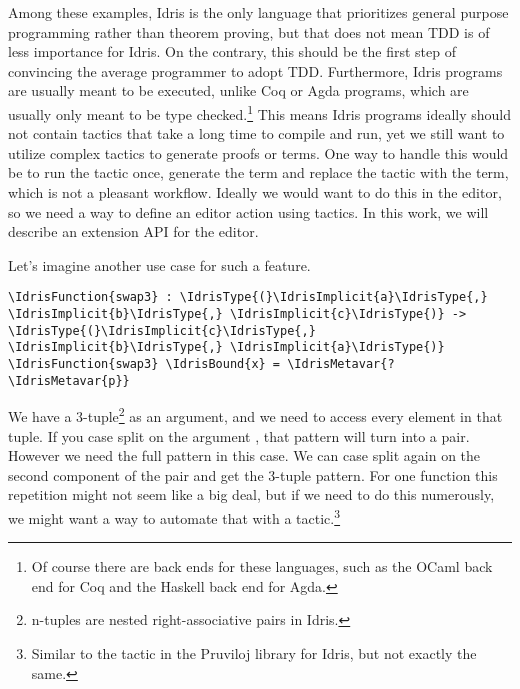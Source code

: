 
Among these examples, Idris is the only language that prioritizes general
purpose programming rather than theorem proving\cite{idrisfaq}, but that does
not mean TDD is of less importance for Idris. On the contrary, this should
be the first step of convincing the average programmer to adopt TDD.
Furthermore, Idris programs are usually meant to be executed, unlike Coq or
Agda programs, which are usually only meant to be type checked.\footnote{Of
  course there are back ends for these languages, such as the OCaml
  back end for Coq and the Haskell back end for Agda.}
This means Idris programs ideally should not contain tactics that take a long
time to compile and run, yet we still want to utilize complex tactics to
generate proofs or terms. One way to handle this would be to run the tactic
once, generate the term and replace the tactic with the term, which is not a
pleasant workflow. Ideally we would want to do this in the editor,
so we need a way to define an editor action using tactics.
In this work, we will describe an extension API for the editor.

Let's imagine another use case for such a feature.
\begin{Verbatim}[commandchars=\\\{\}]
\IdrisFunction{swap3} : \IdrisType{(}\IdrisImplicit{a}\IdrisType{,} \IdrisImplicit{b}\IdrisType{,} \IdrisImplicit{c}\IdrisType{)} -> \IdrisType{(}\IdrisImplicit{c}\IdrisType{,} \IdrisImplicit{b}\IdrisType{,} \IdrisImplicit{a}\IdrisType{)}
\IdrisFunction{swap3} \IdrisBound{x} = \IdrisMetavar{?\IdrisMetavar{p}}
\end{Verbatim}
We have a 3-tuple\footnote{n-tuples are nested right-associative pairs in
Idris.} as an argument, and we need to access every element in that tuple.
If you case split on the argument , that pattern will turn into
a pair. However we need the full  pattern in this
case. We can case split again on the second component of the pair and get the
3-tuple pattern.
For one function this repetition might not seem like a big deal, but if we need
to do this numerously, we might want a way to automate that with a
tactic.\footnote{Similar to the  tactic in the Pruviloj library
for Idris, but not exactly the same.}








